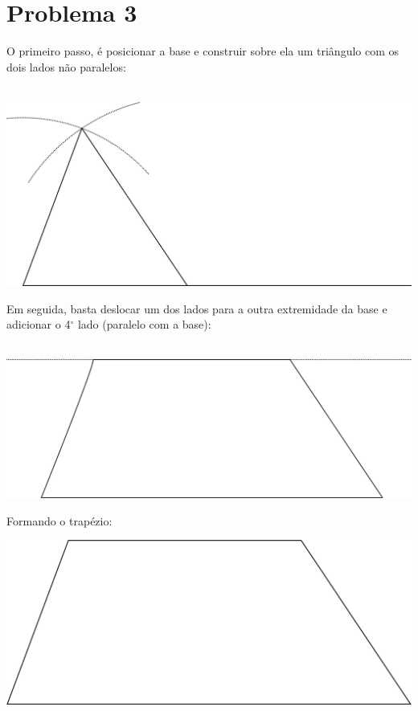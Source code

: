 \documentclass[a4paper,12pt,final]{article}
\begin{document}
\newpage

\section*{Problema 3}

O primeiro passo, é posicionar a base e construir sobre ela um triângulo com os dois lados não paralelos:\\\\
\begin{center}
\includegraphics[scale=.12]{passo1}
\end{center}
\vfill
Em seguida, basta deslocar um dos lados para a outra extremidade da base e adicionar o 4$^{\circ}$ lado (paralelo com a base):\\\\
\begin{center}
\includegraphics[scale=.18]{passo2}
\end{center}
\vfill
Formando o trapézio:
\vfill
\begin{center}
\includegraphics[scale=.25]{passo3}
\end{center}
\vfill
\end{document}

